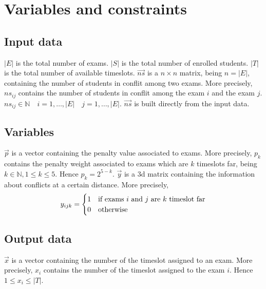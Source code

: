 \section*{Variables and constraints}
\subsection*{Input data}
$ |E| $ is the total number of exams.
\newline
$ |S| $ is the total number of enrolled students.
\newline
$ |T| $ is the total number of available timeslots.
\newline
$ \vec{ns} $ is a $ n \times n $ matrix, being $ n = |E| $, containing the number of students in conflit among two exams. More precisely, $ ns_{ij} $ contains the number of students in conflit among the exam $i$ and the exam $j$.
\newline
$ ns_{ij} \in \mathbb{N} \quad i = 1, \dots , |E| \quad j = 1, \dots , |E| $.
\newline
$ \vec{ns} $ is built directly from the input data.

\subsection*{Variables}
$ \vec{p} $ is a vector containing the penalty value associated to exams. More precisely, $ p_{k} $ contains the penalty weight associated to exams which are $k$ timeslots far, being $ k \in \mathbb{N}, 1 \le k \le 5 $. Hence $p_{k} = 2^{5-k}$.
\newline
$ \vec{y} $ is a 3d matrix containing the information about conflicts at a certain distance. More precisely, 
\[
y_{ijk} = 
\begin{cases}
1	&	\text{if exams $ i $ and $ j $ are $k$ timeslot far}	\\
0	&	\text{otherwise}
\end{cases}
\]

\subsection*{Output data}
$ \vec{x} $ is a vector containing the number of the timeslot assigned to an exam. More precisely, $ x_{i} $ contains the number of the timeslot assigned to the exam $i$. Hence $ 1 \le x_{i} \le |T| $.

